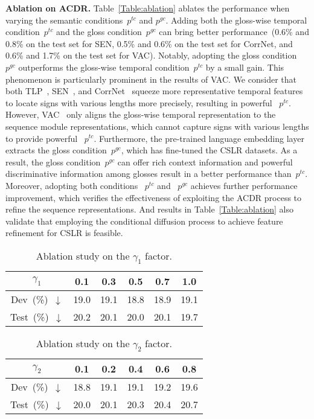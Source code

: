 \documentclass[sigconf]{acmart}
\begin{document}
\noindent \textbf{Ablation on ACDR.}  Table~\ref{Table:ablation} ablates the performance when varying the semantic conditions~$p^{tc}$ and $p^{gc}$.
Adding both the gloss-wise temporal condition~$p^{tc}$ and the gloss condition~$p^{gc}$ can bring better performance~(0.6\% and 0.8\% on the test set for SEN, 0.5\% and 0.6\% on the test set for CorrNet, 
and 0.6\% and 1.7\% on the test set for VAC).
Notably, adopting the gloss condition~$p^{gc}$ outperforms the gloss-wise temporal condition~$p^{tc}$ by a small gain.
This phenomenon is particularly prominent in the results of VAC.
We consider that both TLP~\cite{hu2022temporal}, SEN~\cite{Hu2022SelfEmphasizingNF}, and CorrNet~\cite{hu2023continuous} squeeze
more representative temporal features to locate signs with various lengths more precisely, resulting in powerful ~$p^{tc}$. 
However, VAC~\cite{min2021visual} only aligns the gloss-wise temporal representation to the sequence module representations, which cannot capture signs with various lengths to provide powerful ~$p^{tc}$.
Furthermore, the pre-trained language embedding layer extracts the gloss condition~$p^{gc}$, which has fine-tuned the CSLR datasets. 
As a result, the gloss condition~$p^{gc}$ can offer 
rich context information and powerful discriminative information among glosses result in a better performance than~$p^{tc}$.
Moreover, adopting both conditions ~$p^{tc}$ and ~$p^{gc}$ achieves further performance improvement, which verifies the effectiveness of exploiting the ACDR process to refine the sequence representations. 
And results in Table~\ref{Table:ablation} also validate that employing the conditional diffusion process to achieve feature refinement for CSLR is feasible.



\setlength{\tabcolsep}{5pt}
\begin{table}[!htbp]
\centering
\fontsize{9}{12}\selectfont
\caption{Ablation study on the $\gamma_1$ factor.}
\begin{tabular}{c|c|c|c|c|c} 
\toprule
$\gamma_1$ & 0.1 & 0.3 & 0.5 & 0.7 & 1.0 \\ \midrule Dev~(\%)~$\downarrow$ & 19.0 & 19.1 & 18.8 & 18.9 & 19.1 \\ \midrule Test~(\%)~$\downarrow$ & 20.2 & 20.1 & 20.0 & 20.1 & 19.7 \\  \bottomrule
    \end{tabular}
    \label{Table:gamma1}
\end{table}

\setlength{\tabcolsep}{5pt}
\begin{table}[!htbp]
\centering
\fontsize{9}{12}\selectfont
\caption{Ablation study on the $\gamma_2$ factor.}
\begin{tabular}{c|c|c|c|c|c} 
\toprule
$\gamma_2$ & 0.1 & 0.2 & 0.4 & 0.6 & 0.8 \\ \midrule Dev~(\%)~$\downarrow$ & 18.8 & 19.1 & 19.1 & 19.2 & 19.6 \\ \midrule Test~(\%)~$\downarrow$ & 20.0 & 20.1 & 20.3 & 20.4 & 20.7 \\  \bottomrule
    \end{tabular}
    \label{Table:gamma2}
\end{table}
\end{document}
